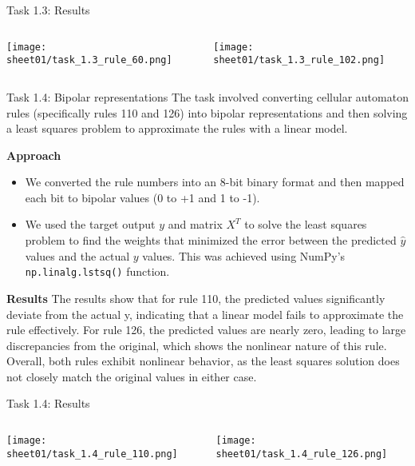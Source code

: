 \documentclass[aspectratio=169]{beamer}
\begin{document}
\begin{frame}{Task 1.3: Results}
\begin{columns}
    \begin{column}{0.5\textwidth}
        \texttt{[image: sheet01/task\_1.3\_rule\_60.png]}
    \end{column}
    \begin{column}{0.5\textwidth}
        \texttt{[image: sheet01/task\_1.3\_rule\_102.png]}
    \end{column}
\end{columns}
\end{frame}


\begin{frame}{Task 1.4: Bipolar representations}
The task involved converting cellular automaton rules (specifically rules 110 and 126) into bipolar representations and then solving a least squares problem to approximate the rules with a linear model.

{\footnotesize
\vspace{1em}
\textbf{Approach}
\begin{itemize}
    \item We converted the rule numbers into an 8-bit binary format and then mapped each bit to bipolar values (0 to +1 and 1 to -1).
    \item {We used the target output \( y \) and matrix \( X^T \) to solve the least squares problem to find the weights that minimized the error between the predicted \( \hat{y} \) values and the actual \( y \) values. This was achieved using NumPy's \texttt{np.linalg.lstsq()} function.}
\end{itemize}

\textbf{Results}
The results show that for rule 110, the predicted values significantly deviate from the actual y, indicating that a linear model fails to approximate the rule effectively. For rule 126, the predicted values are nearly zero, leading to large discrepancies from the original, which shows the nonlinear nature of this rule.
Overall, both rules exhibit nonlinear behavior, as the least squares solution does not closely match the original values in either case.
}
\end{frame}

\begin{frame}{Task 1.4: Results}
\begin{columns}
    \begin{column}{0.42\textwidth}
        \texttt{[image: sheet01/task\_1.4\_rule\_110.png]}
    \end{column}
    \begin{column}{0.57\textwidth}
        \texttt{[image: sheet01/task\_1.4\_rule\_126.png]}
    \end{column}
\end{columns}
\end{frame}
\end{document}
